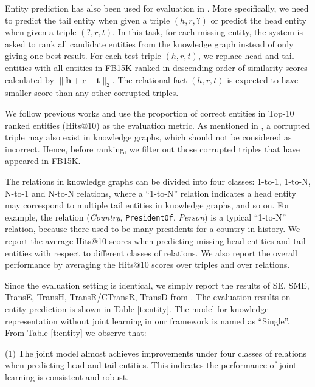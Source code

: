 \documentclass[11pt,a4paper]{article}
\begin{document}
Entity prediction has also been used for evaluation in \cite{bordes2013translating,wang2014transh,lin2015learning,ji2015knowledge,he2015learning,xiao2015transg,ji2016knowledge}. More specifically, we need to predict the tail entity when given a triple $(h, r, ?)$ or predict the head entity when given a triple $(?, r ,t)$. In this task, for each missing entity, the system is asked to rank all candidate entities from the knowledge graph instead of only giving one best result. For each test triple $(h, r, t)$, we replace head and tail entities with all entities in FB15K ranked in descending order of similarity scores calculated by $\lVert \textbf{h} + \textbf{r} - \textbf{t} \rVert_2$. The relational fact $(h, r, t)$ is expected to have smaller score than any other corrupted triples.

We follow previous works and use the proportion of correct entities in Top-10 ranked entities (Hits@10) as the evaluation metric. As mentioned in \cite{bordes2013translating}, a corrupted triple may also exist in knowledge graphs, which should not be considered as incorrect. Hence, before ranking, we filter out those corrupted triples that have appeared in FB15K.

The relations in knowledge graphs can be divided into four classes: 1-to-1, 1-to-N, N-to-1 and N-to-N relations, where a ``1-to-N'' relation indicates a head entity may correspond to multiple tail entities in knowledge graphs, and so on. For example, the relation (\emph{Country}, \texttt{PresidentOf}, \emph{Person}) is a typical ``1-to-N'' relation, because there used to be many presidents for a country in history. We report the average Hits@10 scores when predicting missing head entities and tail entities with respect to different classes of relations. We also report the overall performance by averaging the Hits@10 scores over triples and over relations.

Since the evaluation setting is identical, we simply report the results of SE, SME, TransE, TransH, TransR/CTransR, TransD from \cite{bordes2011learning,bordes2012joint,bordes2013translating,wang2014transh,lin2015learning,ji2015knowledge}. The evaluation results on entity prediction is shown in Table \ref{t:entity}. The model for knowledge representation without joint learning in our framework is named as ``Single''. From Table \ref{t:entity} we observe that:

(1) The joint model almost achieves improvements under four classes of relations when predicting head and tail entities. This indicates the performance of joint learning is consistent and robust. 
\end{document}
